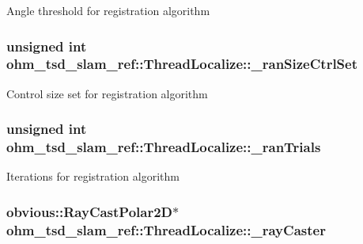 Angle threshold for registration algorithm \hypertarget{classohm__tsd__slam__ref_1_1ThreadLocalize_a33d533907a160e94d357ecd3d8226f9b}{
\subsubsection[{\-\_\-ran\-Size\-Ctrl\-Set}]{\setlength{\rightskip}{0pt plus 5cm}unsigned int ohm\-\_\-tsd\-\_\-slam\-\_\-ref\-::\-Thread\-Localize\-::\-\_\-ran\-Size\-Ctrl\-Set\hspace{0.3cm}{\ttfamily [private]}}}\label{classohm__tsd__slam__ref_1_1ThreadLocalize_a33d533907a160e94d357ecd3d8226f9b}
Control size set for registration algorithm \hypertarget{classohm__tsd__slam__ref_1_1ThreadLocalize_a756d269b7f0782d3e789f29bfc7d838d}{
\subsubsection[{\-\_\-ran\-Trials}]{\setlength{\rightskip}{0pt plus 5cm}unsigned int ohm\-\_\-tsd\-\_\-slam\-\_\-ref\-::\-Thread\-Localize\-::\-\_\-ran\-Trials\hspace{0.3cm}{\ttfamily [private]}}}\label{classohm__tsd__slam__ref_1_1ThreadLocalize_a756d269b7f0782d3e789f29bfc7d838d}
Iterations for registration algorithm \hypertarget{classohm__tsd__slam__ref_1_1ThreadLocalize_acf45081cf4d42221dbc924b9fd6a1384}{
\subsubsection[{\-\_\-ray\-Caster}]{\setlength{\rightskip}{0pt plus 5cm}obvious\-::\-Ray\-Cast\-Polar2\-D$\ast$ ohm\-\_\-tsd\-\_\-slam\-\_\-ref\-::\-Thread\-Localize\-::\-\_\-ray\-Caster\hspace{0.3cm}{\ttfamily [private]}}}\label{classohm__tsd__slam__ref_1_1ThreadLocalize_acf45081cf4d42221dbc924b9fd6a1384}
